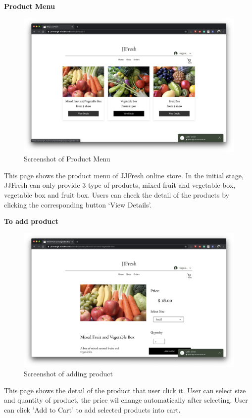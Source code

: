 \textbf{Product Menu}
\begin{figure}[htp]
\centering
\includegraphics[width=\textwidth]{Figures/productMenu.png}
\caption{Screenshot of Product Menu }
\label{fig:productMenu}
\end{figure}

This page shows the product menu of JJFresh online store. In the initial stage, JJFresh can only provide 3 type of products, mixed fruit and vegetable box, vegetable box and fruit box. Users can check the detail of the products by clicking the corresponding button ‘View Details’.

\clearpage
\textbf{To add product}
\begin{figure}[htp]
\centering
\includegraphics[width=\textwidth]{Figures/addProduct.png}
\caption{Screenshot of adding product}
\label{fig:addProduct}
\end{figure}

This page shows the detail of the product that user click it. User can select size and quantity of product, the price wil change automatically after selecting. User can click 'Add to Cart' to add selected products into cart.

